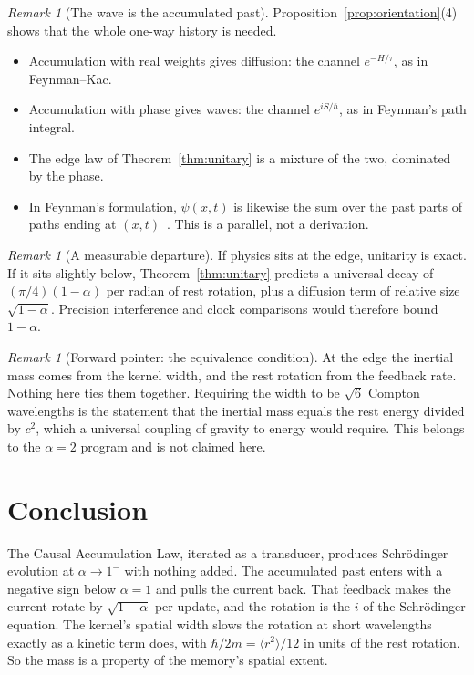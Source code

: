 \documentclass[11pt]{amsart}
\theoremstyle{definition}
\theoremstyle{remark}
\newtheorem{remark}[theorem]{Remark}
\begin{document}
\begin{remark}[The wave is the accumulated past]
Proposition~\ref{prop:orientation}(4) shows that the whole one-way history is needed.
\begin{itemize}
\item Accumulation with real weights gives diffusion: the channel $e^{-H/\tau}$, as in Feynman--Kac.
\item Accumulation with phase gives waves: the channel $e^{iS/\hbar}$, as in Feynman's path integral.
\item The edge law of Theorem~\ref{thm:unitary} is a mixture of the two, dominated by the phase.
\item In Feynman's formulation, $\psi(x,t)$ is likewise the sum over the past parts of paths ending at $(x,t)$~\cite{Feynman}. This is a parallel, not a derivation.
\end{itemize}
\end{remark}

\begin{remark}[A measurable departure]
If physics sits at the edge, unitarity is exact. If it sits slightly below, Theorem~\ref{thm:unitary} predicts a universal decay of $(\pi/4)(1-\alpha)$ per radian of rest rotation, plus a diffusion term of relative size $\sqrt{1-\alpha}$. Precision interference and clock comparisons would therefore bound $1-\alpha$.
\end{remark}

\begin{remark}[Forward pointer: the equivalence condition]
At the edge the inertial mass comes from the kernel width, and the rest rotation from the feedback rate. Nothing here ties them together. Requiring the width to be $\sqrt6$ Compton wavelengths is the statement that the inertial mass equals the rest energy divided by $c^2$, which a universal coupling of gravity to energy would require. This belongs to the $\alpha=2$ program and is not claimed here.
\end{remark}

\section{Conclusion}

The Causal Accumulation Law, iterated as a transducer, produces Schr\"odinger evolution at $\alpha\to1^-$ with nothing added. The accumulated past enters with a negative sign below $\alpha=1$ and pulls the current back. That feedback makes the current rotate by $\sqrt{1-\alpha}$ per update, and the rotation is the $i$ of the Schr\"odinger equation. The kernel's spatial width slows the rotation at short wavelengths exactly as a kinetic term does, with $\hbar/2m=\langle r^2\rangle/12$ in units of the rest rotation. So the mass is a property of the memory's spatial extent.
\end{document}
